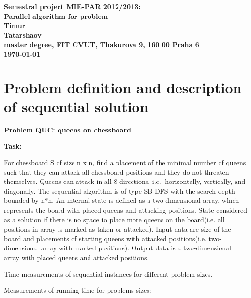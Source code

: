 \documentclass[12pt]{article}
\begin{document}








\begin{center}
\bf Semestral project MIE-PAR 2012/2013:\\[5mm]
    Parallel algorithm for problem\\[5mm]
       Timur\\
       Tatarshaov\\[2mm]
master degree, FIT CVUT, Thakurova 9, 160 00 Praha 6\\[2mm]
\today
\end{center}








\section{Problem definition and description of sequential solution}


\textbf{Problem QUC: queens on chessboard}      
 
       
       \textbf{Task:}


For chessboard S of size n x n, find a placement of the minimal number of queens such that they can attack all chessboard positions and they do not threaten themselves. Queens can attack in all 8 directions, i.e., horizontally, vertically, and diagonally.
       The sequential algorithm is of type SB-DFS with the search depth bounded by n*n. An internal state is defined as a two-dimensional array, which represents the board with placed queens and attacking positions. State considered as a solution if there is no space to place more queens on the board(i.e. all positions in array is marked as taken or attacked).
       Input data are size of the board and placements of starting queens with attacked positions(i.e. two-dimensional array with marked positions).
       Output data is a two-dimensional array with placed queens and attacked positions.
       
       Time measurements of sequential instances for different problem sizes.
       
    Measurements of running time for problems sizes:
\end{document}
